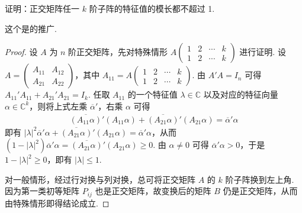 \documentclass[../../main.tex]{subfiles}%
\begin{document}
\begin{proposition}\label{proposition:例9.46}
证明：正交矩阵任一 \(k\) 阶子阵的特征值的模长都不超过 1.
\end{proposition}
\begin{remark}
这个是的推广.
\end{remark}
\begin{proof}

设 \(A\) 为 \(n\) 阶正交矩阵，先对特殊情形 \(A\begin{pmatrix}
1 & 2 & \cdots & k \\
1 & 2 & \cdots & k
\end{pmatrix}\) 进行证明. 设 \(A = \begin{pmatrix}
A_{11} & A_{12} \\
A_{21} & A_{22}
\end{pmatrix}\)，其中 \(A_{11} = A\begin{pmatrix}
1 & 2 & \cdots & k \\
1 & 2 & \cdots & k
\end{pmatrix}\). 由 \(A'A = I_n\) 可得 \(A_{11}'A_{11} + A_{21}'A_{21} = I_k\). 任取 \(A_{11}\) 的一个特征值 \(\lambda \in \mathbb{C}\) 以及对应的特征向量 \(\alpha \in \mathbb{C}^k\)，则将上式左乘 \(\overline{\alpha}'\)，右乘 \(\alpha\) 可得
\begin{align*}
\overline{(A_{11}\alpha)}'(A_{11}\alpha) + \overline{(A_{21}\alpha)}'(A_{21}\alpha) = \overline{\alpha}'\alpha
\end{align*}
即有 \(|\lambda|^2\overline{\alpha}'\alpha + \overline{(A_{21}\alpha)}'(A_{21}\alpha) = \overline{\alpha}'\alpha\)，从而 \((1 - |\lambda|^2)\overline{\alpha}'\alpha = \overline{(A_{21}\alpha)}'(A_{21}\alpha) \geqslant  0\). 由 \(\alpha \neq 0\) 可得 \(\overline{\alpha}'\alpha > 0\)，于是 \(1 - |\lambda|^2 \geqslant  0\)，即有 \(|\lambda| \leqslant  1\). 

对一般情形，经过行对换与列对换，总可将正交矩阵 \(A\) 的 \(k\) 阶子阵换到左上角. 因为第一类初等矩阵 \(P_{ij}\) 也是正交矩阵，故变换后的矩阵 \(B\) 仍是正交矩阵，从而由特殊情形即得结论成立.

\end{proof}
\end{document}
